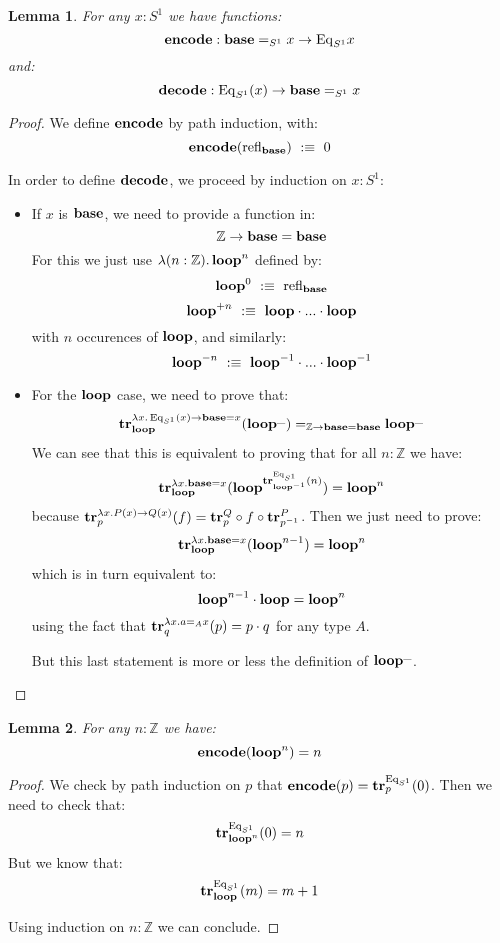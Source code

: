 \documentclass{article}
\newcommand{\encode}{\mathrm{\bf encode}}
\newcommand{\decode}{\mathrm{\bf decode}}
\newcommand{\U}{{\mathcal U}}
\renewcommand{\r}{\rightarrow}
\newcommand{\Gl}{\lambda}
\newcommand{\ap}{\mathrm{ap}}
\newcommand{\refl}{\mathrm{refl}}
\newcommand{\tr}{\mathrm{\bf tr}}
\newcommand{\ua}{\mathrm{\bf ua}}
\newcommand{\base}{\mathrm{\bf base}}
\renewcommand{\loop}{\mathrm{\bf loop}}
\newcommand{\Eq}{\mathrm{Eq}}
\newtheorem{lemma}{Lemma}
\begin{document}
\begin{lemma}
For any $x:S^1$ we have functions:
\[\encode : \base=_{S^1} x \r \Eq_{S^1} x\]
and:
\[\decode : \Eq_{S^1}(x) \r \base=_{S^1} x\]
\end{lemma}
\begin{proof}
We define $\encode$ by path induction, with:
\[\encode(\refl_\base) \ :\equiv\ 0\]

In order to define $\decode$, we proceed by induction on $x:S^1$:
\begin{itemize}
\item If $x$ is $\base$, we need to provide a function in:
\[\mathbb{Z} \r \base=\base\]
For this we just use $\Gl (n:\mathbb{Z}).\, \loop^n$ defined by:
\[\loop^0 \ :\equiv \ \refl_\base\]
\[\loop^{+n} \ :\equiv\ \loop \cdot ...\cdot \loop \]
with $n$ occurences of $\loop$, and similarly:
\[\loop^{-n} \ :\equiv\  \loop^{-1} \cdot ... \cdot \loop^{-1}\]
\item For the $\loop$ case, we need to prove that:
\[\tr^{\Gl x.\, \Eq_{S^1}(x)\r \base=x}_{\loop}(\loop^{\_}) =_{\mathbb{Z} \r \base=\base} \loop^{\_} \]
We can see that this is equivalent to proving that for all $n:\mathbb{Z}$ we have:
\[ \tr^{\Gl x. \base=x}_\loop(\loop^{\tr_{\loop^{-1}}^{\Eq_{S^1}}(n)})= \loop^n\]
because $\tr^{\Gl x.P(x)\r Q(x)}_p(f) = \tr^Q_p\circ f\circ \tr^P_{p^{-1}}$. Then we just need to prove:%
\[\tr^{\Gl x.\base=x}_\loop(\loop^{n-1}) = \loop^n\]
which is in turn equivalent to:
\[\loop^{n-1}\cdot\loop = \loop^n\]
using the fact that $\tr_q^{\Gl x.a=_Ax}(p) = p\cdot q$ for any type $A$.

But this last statement is more or less the definition of $\loop^{\_}$.
\end{itemize}
\end{proof}

\begin{lemma}
For any $n:\mathbb{Z}$ we have:
\[\encode(\loop^n) = n\]
\end{lemma}
\begin{proof}
We check by path induction on $p$ that $\encode(p) = \tr^{\Eq_{S^1}}_p(0)$. Then we need to check that: 
\[\tr^{\Eq_{S^1}}_{\loop^n}(0) = n\]
But we know that:%
\[\tr^{\Eq_{S^1}}_\loop(m) = m+1\]

Using induction on $n:\mathbb{Z}$ we can conclude. %
\end{proof}
\end{document}
